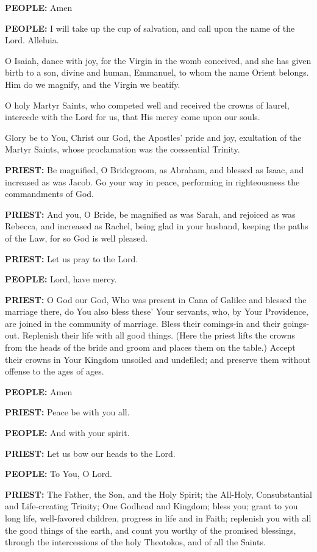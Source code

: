 \textbf{PEOPLE:} Amen

\textbf{PEOPLE:} I will take up the cup of salvation, and call upon the
name of the Lord. Alleluia.

O Isaiah, dance with joy, for the Virgin in the womb conceived, and she
has given birth to a son, divine and human, Emmanuel, to whom the name
Orient belongs. Him do we magnify, and the Virgin we beatify.

O holy Martyr Saints, who competed well and received the crowns of
laurel, intercede with the Lord for us, that His mercy come upon our
souls.

Glory be to You, Christ our God, the Apostles' pride and joy, exultation
of the Martyr Saints, whose proclamation was the coessential Trinity.

\textbf{PRIEST:} Be magnified, O Bridegroom, as Abraham, and blessed as
Isaac, and increased as was Jacob. Go your way in peace, performing in
righteousness the commandments of God.

\textbf{PRIEST:} And you, O Bride, be magnified as was Sarah, and
rejoiced as was Rebecca, and increased as Rachel, being glad in your
husband, keeping the paths of the Law, for so God is well pleased.

\textbf{PRIEST:} Let us pray to the Lord.

\textbf{PEOPLE:} Lord, have mercy.

\textbf{PRIEST:} O God our God, Who was present in Cana of Galilee and
blessed the marriage there, do You also bless these' Your servants, who,
by Your Providence, are joined in the community of marriage. Bless their
comings-in and their goings-out. Replenish their life with all good
things. (Here the priest lifts the crowns from the heads of the bride
and groom and places them on the table.) Accept their crowns in Your
Kingdom unsoiled and undefiled; and preserve them without offense to the
ages of ages.

\textbf{PEOPLE:} Amen

\textbf{PRIEST:} Peace be with you all.

\textbf{PEOPLE:} And with your spirit.

\textbf{PRIEST:} Let us bow our heads to the Lord.

\textbf{PEOPLE:} To You, O Lord.

\textbf{PRIEST:} The Father, the Son, and the Holy Spirit; the All-Holy,
Consubstantial and Life-creating Trinity; One Godhead and Kingdom; bless
you; grant to you long life, well-favored children, progress in life and
in Faith; replenish you with all the good things of the earth, and count
you worthy of the promised blessings, through the intercessions of the
holy Theotokos, and of all the Saints.

